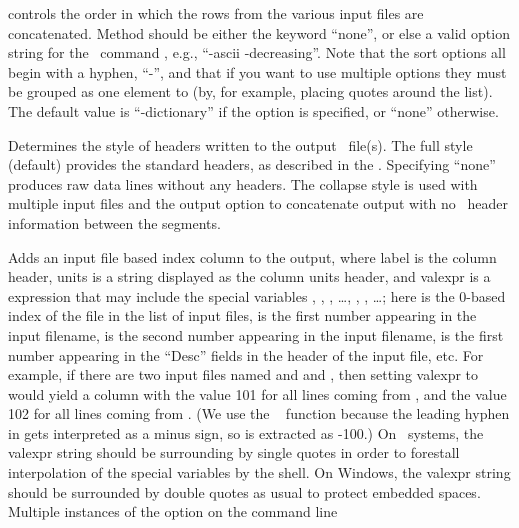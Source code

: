 \begin{description}
  controls the order in which the rows from the various input files
  are concatenated.  Method should be either the keyword ``none'', or
  else a valid option string for the \Tcl\ command , e.g.,
  ``-ascii -decreasing''.  Note that the  sort options all
  begin with a hyphen, ``-'', and that if you want to use multiple
  options they must be grouped as one element to  (by,
  for example, placing quotes around the list).  The default value is
  ``-dictionary'' if the  option is specified, or ``none''
  otherwise.
\item[\optkey{-headers \boa full\pipe collapse\pipe none\bca}]
  Determines the style of headers written to the output \ODT\ file(s).
  The full style (default) provides the standard headers, as described
  in the .  Specifying ``none'' produces raw data
  lines without any headers.  The collapse style is used with multiple
  input files and the  output option to concatenate
  output with no \ODT\ header information between the segments.
\item[\optkey{-index label units valexpr}]
  Adds an input file based index column to the output, where label is
  the column header, units is a string displayed as the column units
  header, and valexpr is a \Tcl\  expression that may include
  the special variables , , , \ldots, ,
  , \ldots; here  is the 0-based index of
  the file in the list of input files,  is the first number
  appearing in the input filename,  is the second number
  appearing in the input filename,  is the first number
  appearing in the ``Desc'' fields in the header of the input file,
  etc.  For example, if there are two input files named
   and and , then setting valexpr to
   would yield a column with the value 101 for all lines
  coming from , and the value 102 for all lines coming
  from  .  (We use the \Tcl\  function
   because the leading hyphen in  gets
  interpreted as a minus sign, so  is extracted as -100.)
  On \Unix\ systems, the valexpr string should be surrounding by single
  quotes in order to forestall interpolation of the special variables
  by the shell.  On Windows, the valexpr string should be surrounded
  by double quotes as usual to protect embedded spaces.
  Multiple instances of the  option on the command line

\end{description}
